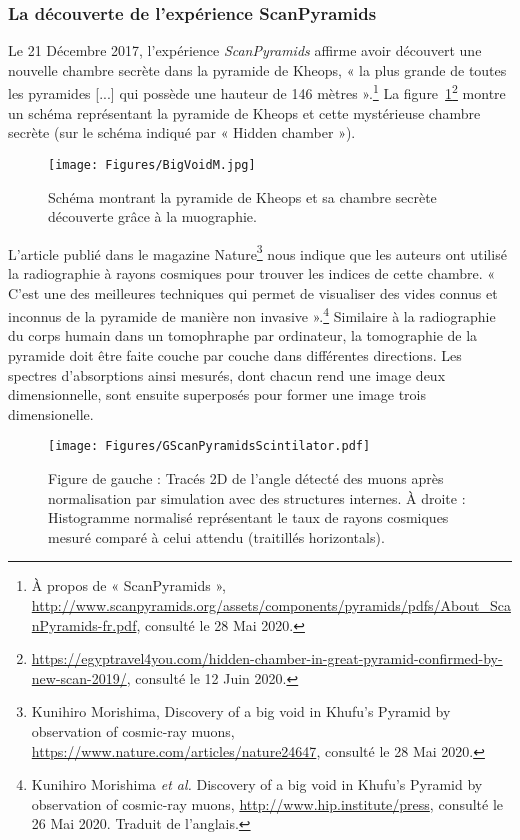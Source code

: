\documentclass[a4paper, 12pt]{article}
\begin{document}
\begin{spacing}{1.5}
\subsubsection{La découverte de l'expérience ScanPyramids}
\label{subsubsection:ScanPyramids}

Le 21 Décembre 2017, l'expérience \emph{ScanPyramids} affirme avoir découvert une nouvelle chambre secrète dans la pyramide de Kheops, « la plus grande de toutes les pyramides [...] qui possède une hauteur de 146 mètres ».\footnote{À propos de « ScanPyramids », \url{http://www.scanpyramids.org/assets/components/pyramids/pdfs/About_ScanPyramids-fr.pdf}, consulté le 28 Mai 2020.} La figure~\ref{fig:BigVoidM}\footnote{\url{https://egyptravel4you.com/hidden-chamber-in-great-pyramid-confirmed-by-new-scan-2019/}, consulté le 12 Juin 2020.} montre un schéma représentant la pyramide de Kheops et cette mystérieuse chambre secrète (sur le schéma indiqué par « Hidden chamber »).

\begin{figure}[t]
\begin{center}
\texttt{[image: Figures/BigVoidM.jpg]}
\caption{\label{fig:BigVoidM} Schéma montrant la pyramide de Kheops et sa chambre secrète découverte grâce à la muographie.}
\end{center}
\end{figure}


L'article publié dans le magazine Nature\footnote{Kunihiro Morishima, Discovery of a big void in Khufu’s Pyramid by observation of cosmic-ray muons, \url{https://www.nature.com/articles/nature24647}, consulté le 28 Mai 2020.} nous indique que les auteurs ont utilisé la radiographie à rayons cosmiques pour trouver les indices de cette chambre. « C'est une des meilleures techniques qui permet de visualiser des vides connus et inconnus de la pyramide de manière non invasive ».\footnote{Kunihiro Morishima \emph{et al.} Discovery of a big void in Khufu's Pyramid by observation of cosmic-ray muons, \url{http://www.hip.institute/press}, consulté le 26 Mai 2020. Traduit de l'anglais.} Similaire à la radiographie du corps humain dans un tomophraphe par ordinateur, la tomographie de la pyramide doit être faite couche par couche dans différentes directions. Les spectres d'absorptions ainsi mesurés, dont chacun rend une image deux dimensionnelle, sont ensuite superposés pour former une image trois dimensionelle. 

\begin{figure}[t]
\begin{center}
\texttt{[image: Figures/GScanPyramidsScintilator.pdf]}
\caption{\label{fig:GScanPyramidsScintilator} Figure de gauche : Tracés 2D de l'angle détecté des muons après normalisation par simulation avec des structures internes. À droite : Histogramme normalisé représentant le taux de rayons cosmiques mesuré comparé à celui attendu (traitillés horizontals).}
\end{center}
\end{figure}


\end{spacing}
\end{document}
